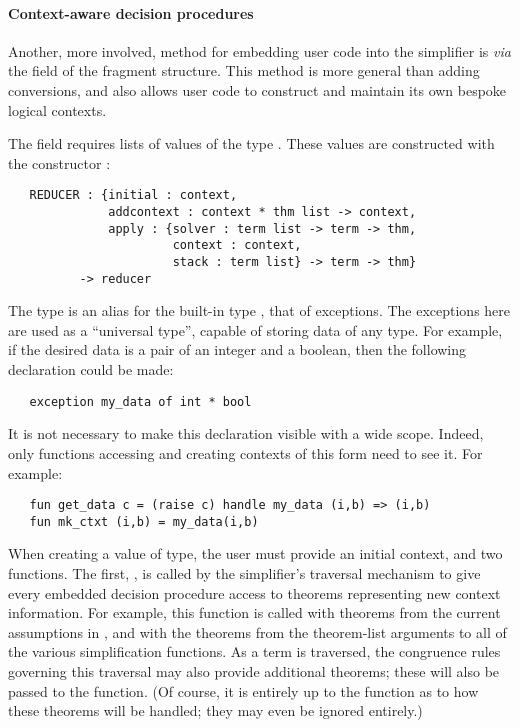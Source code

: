 \paragraph{Context-aware decision procedures}
Another, more involved, method for embedding user code into the
simplifier is \emph{via} the  field of the \simpset{}
fragment structure.  This method is more general than adding
conversions, and also allows user code to construct and maintain its
own bespoke logical contexts.

The  field requires lists of values of the type
.  These values are constructed with the
constructor :
\begin{hol}
\begin{verbatim}
   REDUCER : {initial : context,
              addcontext : context * thm list -> context,
              apply : {solver : term list -> term -> thm,
                       context : context,
                       stack : term list} -> term -> thm}
          -> reducer
\end{verbatim}
\end{hol}
The  type is an alias for the built-in \ML{} type
, that of exceptions.  The exceptions here are used as a
``universal type'', capable of storing data of any type.  For example,
if the desired data is a pair of an integer and a boolean, then the
following declaration could be made:
\begin{hol}
\begin{verbatim}
   exception my_data of int * bool
\end{verbatim}
\end{hol}
It is not necessary to make this declaration visible with a wide
scope.  Indeed, only functions accessing and creating contexts of this
form need to see it. For example:
\begin{hol}
\begin{verbatim}
   fun get_data c = (raise c) handle my_data (i,b) => (i,b)
   fun mk_ctxt (i,b) = my_data(i,b)
\end{verbatim}
\end{hol}

When creating a value of  type, the user must provide an
initial context, and two functions.  The first, , is
called by the simplifier's traversal mechanism to give every embedded
decision procedure access to theorems representing new context
information.  For example, this function is called with theorems from
the current assumptions in , and with the theorems
from the theorem-list arguments to all of the various simplification
functions.  As a term is traversed, the congruence rules governing
this traversal may also provide additional theorems; these will also
be passed to the  function.  (Of course, it is entirely
up to the  function as to how these theorems will be
handled; they may even be ignored entirely.)

